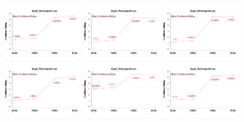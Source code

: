 \begin{figure}[th]
\centering
\includegraphics[width=0.30\textwidth]{Figures/MirrorRating_Exp2_P1} \includegraphics[width=0.30\textwidth]{Figures/MirrorRating_Exp2_P2} \includegraphics[width=0.30\textwidth]{Figures/MirrorRating_Exp2_P3}
\includegraphics[width=0.30\textwidth]{Figures/MirrorRating_Exp2_P4} \includegraphics[width=0.30\textwidth]{Figures/MirrorRating_Exp2_P5} \includegraphics[width=0.30\textwidth]{Figures/MirrorRating_Exp2_P6}

\end{figure}

